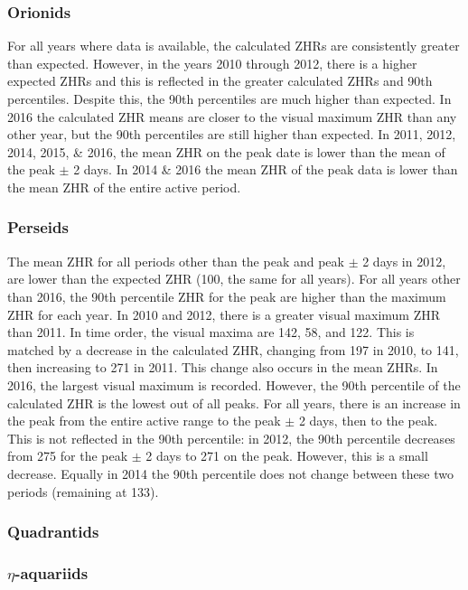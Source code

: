 \subsubsection{Orionids}
For all years where data is available, the calculated ZHRs are consistently greater than expected. However, in the years 2010 through 2012, there is a higher expected ZHRs and this is reflected in the greater calculated ZHRs and 90th percentiles. Despite this, the 90th percentiles are much higher than expected. In 2016 the calculated ZHR means are closer to the visual maximum ZHR than any other year, but the 90th percentiles are still higher than expected. 
In 2011, 2012, 2014, 2015, \& 2016, the mean ZHR on the peak date is lower than the mean of the peak $\pm$ 2 days. In 2014 \& 2016 the mean ZHR of the peak data is lower than the mean ZHR of the entire active period.

\subsubsection{Perseids}
The mean ZHR for all periods other than the peak and peak $\pm$ 2 days in 2012, are lower than the expected ZHR (100, the same for all years). For all years other than 2016, the 90th percentile ZHR for the peak are higher than the maximum ZHR for each year.
In 2010 and 2012, there is a greater visual maximum ZHR than 2011. In time order, the visual maxima are 142, 58, and 122. This is matched by a decrease in the calculated ZHR, changing from 197 in 2010, to 141, then increasing to 271 in 2011. This change also occurs in the mean ZHRs.
In 2016, the largest visual maximum is recorded. However, the 90th percentile of the calculated ZHR is the lowest out of all peaks.
For all years, there is an increase in the peak from the entire active range to the peak $\pm$ 2 days, then to the peak. This is not reflected in the 90th percentile: in 2012, the 90th percentile decreases from 275 for the peak $\pm$ 2 days to 271 on the peak. However, this is a small decrease. Equally in 2014 the 90th percentile does not change between these two periods (remaining at 133).

\subsubsection{Quadrantids}

\subsubsection{$\eta$-aquariids}

